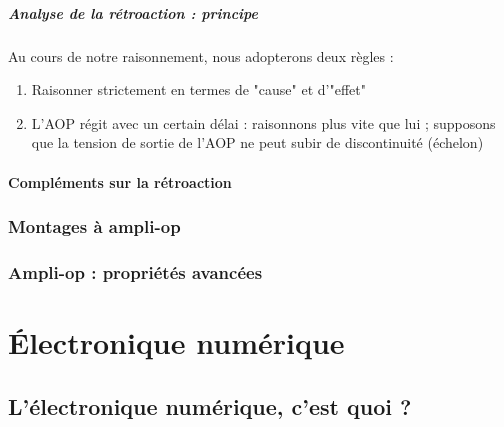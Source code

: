\documentclass	[11pt, a4paper, openany]{book}
\begin{document}
\subsubsection{Analyse de la rétroaction : principe}
Au cours de notre raisonnement, nous adopterons deux règles :
\begin{enumerate}
\item Raisonner strictement en termes de "cause" et d'"effet"
\item L'AOP régit avec un certain délai : raisonnons plus vite que lui ; supposons que la tension de sortie de l'AOP ne peut subir de discontinuité (échelon)
\end{enumerate}


\subsection{Compléments sur la rétroaction}




\section{Montages à ampli-op}
\section{Ampli-op : propriétés avancées}


\part{Électronique numérique}
\setcounter{chapter}{9}
\chapter{L'électronique numérique, c'est quoi ?}
\end{document}
